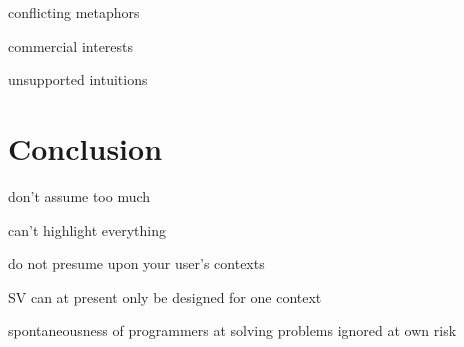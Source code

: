 \documentclass[11pt, a4paper, ngerman, twoside]{article}
\theoremstyle{plain}\newtheorem{Lemma}{Lemma}
\theoremstyle{plain}\newtheorem{Satz}[Lemma]{Satz}
\theoremstyle{definition}\newtheorem{Definition}[Lemma]{Definition}
\theoremstyle{definition}\newtheorem*{Beispiel}{Beispiel}
\theoremstyle{remark}\newtheorem*{Bemerkung}{Bemerkung}
\begin{document}
conflicting metaphors

commercial interests

unsupported intuitions

\section{Conclusion}

don’t assume too much

can’t highlight everything

do not presume upon your user’s contexts

SV can at present only be designed for one context

spontaneousness of programmers at solving problems ignored at own risk



\end{document}

